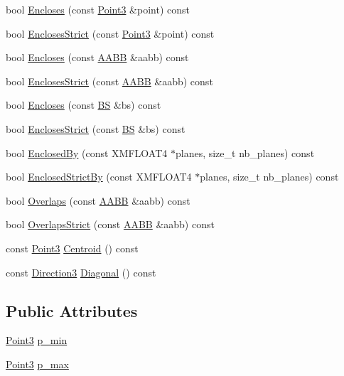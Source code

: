 \begin{DoxyCompactItemize}
\item 
bool \hyperlink{structmage_1_1_a_a_b_b_a67d1820b5ee787f02e6cfd593aca35fd}{Encloses} (const \hyperlink{structmage_1_1_point3}{Point3} \&point) const
\item 
bool \hyperlink{structmage_1_1_a_a_b_b_a436950a97b647179506bb42a3f2f2b34}{Encloses\+Strict} (const \hyperlink{structmage_1_1_point3}{Point3} \&point) const
\item 
bool \hyperlink{structmage_1_1_a_a_b_b_a0d6619404376bacf956b4a0c6662696f}{Encloses} (const \hyperlink{structmage_1_1_a_a_b_b}{A\+A\+BB} \&aabb) const
\item 
bool \hyperlink{structmage_1_1_a_a_b_b_a3bb59de6eca634cb3ddec4ad314fde21}{Encloses\+Strict} (const \hyperlink{structmage_1_1_a_a_b_b}{A\+A\+BB} \&aabb) const
\item 
bool \hyperlink{structmage_1_1_a_a_b_b_a3742367836e8eaa41e4e2cd97dec10b1}{Encloses} (const \hyperlink{structmage_1_1_b_s}{BS} \&bs) const
\item 
bool \hyperlink{structmage_1_1_a_a_b_b_a6a9979511124d853cd1df0f56a9bda72}{Encloses\+Strict} (const \hyperlink{structmage_1_1_b_s}{BS} \&bs) const
\item 
bool \hyperlink{structmage_1_1_a_a_b_b_aeedfc722f7dea6caba965d6f37145ace}{Enclosed\+By} (const X\+M\+F\+L\+O\+A\+T4 $\ast$planes, size\+\_\+t nb\+\_\+planes) const
\item 
bool \hyperlink{structmage_1_1_a_a_b_b_a6c9718624f1b6595eb5bd26cd2456a57}{Enclosed\+Strict\+By} (const X\+M\+F\+L\+O\+A\+T4 $\ast$planes, size\+\_\+t nb\+\_\+planes) const
\item 
bool \hyperlink{structmage_1_1_a_a_b_b_a5a959edc3bc5ccdd29025d612c2e66e3}{Overlaps} (const \hyperlink{structmage_1_1_a_a_b_b}{A\+A\+BB} \&aabb) const
\item 
bool \hyperlink{structmage_1_1_a_a_b_b_ae8e6eca9c5e30015a91ab2e900594bfc}{Overlaps\+Strict} (const \hyperlink{structmage_1_1_a_a_b_b}{A\+A\+BB} \&aabb) const
\item 
const \hyperlink{structmage_1_1_point3}{Point3} \hyperlink{structmage_1_1_a_a_b_b_ab6d0c4a99b351174fabecec529d926ed}{Centroid} () const
\item 
const \hyperlink{structmage_1_1_direction3}{Direction3} \hyperlink{structmage_1_1_a_a_b_b_a4005fdca21eae3fdaa046a57b155fca0}{Diagonal} () const
\end{DoxyCompactItemize}
\subsection*{Public Attributes}
\begin{DoxyCompactItemize}
\item 
\hyperlink{structmage_1_1_point3}{Point3} \hyperlink{structmage_1_1_a_a_b_b_a600c62081fd3516c0be64bb81495cd1d}{p\+\_\+min}
\item 
\hyperlink{structmage_1_1_point3}{Point3} \hyperlink{structmage_1_1_a_a_b_b_ad0a69206176c61ce9a71f2ddb0e5deb2}{p\+\_\+max}
\end{DoxyCompactItemize}


